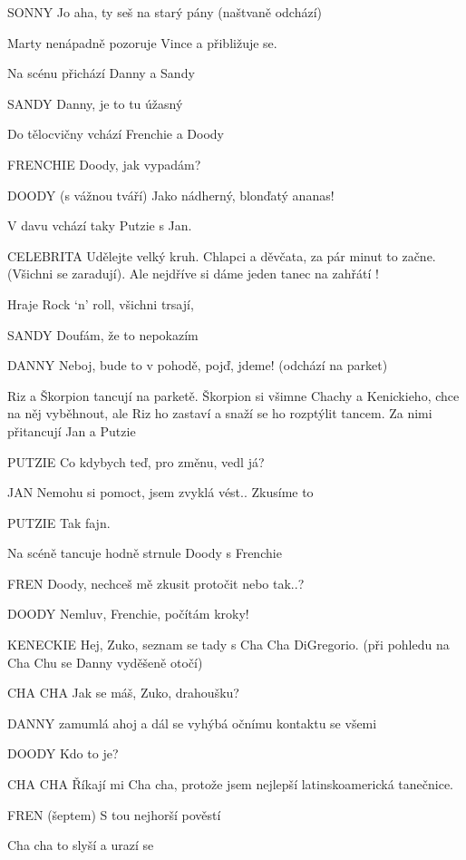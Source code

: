 SONNY        Jo aha, ty seš na starý pány (naštvaně odchází) 

Marty nenápadně pozoruje Vince a přibližuje se. 

Na scénu přichází Danny a Sandy 

SANDY        Danny, je to tu úžasný

Do tělocvičny vchází Frenchie a Doody

FRENCHIE        Doody, jak vypadám? 

DOODY        (s vážnou tváří) Jako nádherný, blonďatý ananas! 

V davu vchází taky Putzie s Jan. 

CELEBRITA         Udělejte velký kruh. Chlapci a děvčata, za pár minut to začne.         (Všichni se zaradují). Ale nejdříve si dáme jeden tanec na zahřátí ! 

Hraje Rock ‘n’ roll, všichni trsají,

SANDY        Doufám, že to nepokazím 

DANNY        Neboj, bude to v pohodě, pojď, jdeme! (odchází na parket)

        Riz a Škorpion tancují na parketě. Škorpion si všimne Chachy a Kenickieho, chce na něj vyběhnout, ale Riz ho zastaví a snaží se ho rozptýlit tancem. Za nimi přitancují Jan a Putzie

PUTZIE        Co kdybych teď, pro změnu, vedl já?

JAN        Nemohu si pomoct, jsem zvyklá vést.. Zkusíme to

PUTZIE        Tak fajn. 

Na scéně tancuje hodně strnule Doody s Frenchie

FREN        Doody, nechceš mě zkusit protočit nebo tak..?

DOODY        Nemluv, Frenchie, počítám kroky! 

KENECKIE        Hej, Zuko, seznam se tady s Cha Cha DiGregorio. (při pohledu na Cha         Chu se Danny vyděšeně otočí)

CHA CHA         Jak se máš, Zuko, drahoušku?

DANNY        zamumlá ahoj a dál se vyhýbá očnímu kontaktu se všemi 

DOODY        Kdo to je? 

CHA CHA        Říkají mi Cha cha, protože jsem nejlepší latinskoamerická tanečnice. 

FREN        (šeptem) S tou nejhorší pověstí

Cha cha to slyší a urazí se 

